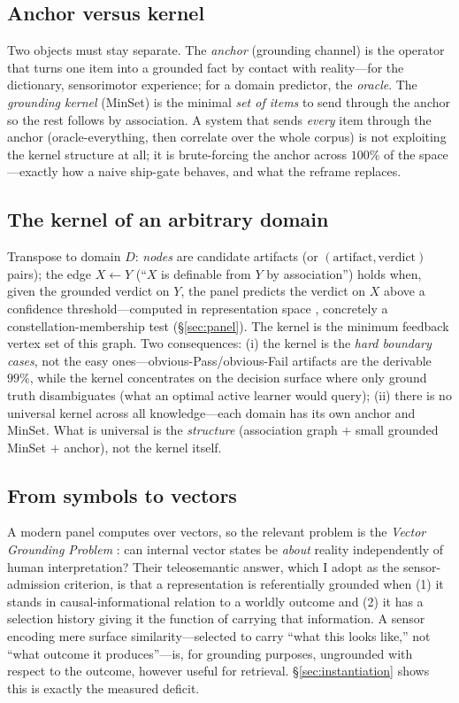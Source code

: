 \documentclass[10pt,twocolumn]{article}
\begin{document}
\subsection{Anchor versus kernel}
Two objects must stay separate. The \emph{anchor} (grounding channel) is the
operator that turns one item into a grounded fact by contact with reality---for
the dictionary, sensorimotor experience; for a domain predictor, the
\emph{oracle}. The \emph{grounding kernel} (MinSet) is the minimal \emph{set of
items} to send through the anchor so the rest follows by association. A system
that sends \emph{every} item through the anchor (oracle-everything, then correlate
over the whole corpus) is not exploiting the kernel structure at all; it is
brute-forcing the anchor across $100\%$ of the space---exactly how a naive
ship-gate behaves, and what the reframe replaces.

\subsection{The kernel of an arbitrary domain}
Transpose to domain $D$: \emph{nodes} are candidate artifacts (or
$(\text{artifact},\text{verdict})$ pairs); the edge $X\!\leftarrow\!Y$ (``$X$ is
definable from $Y$ by association'') holds when, given the grounded verdict on
$Y$, the panel predicts the verdict on $X$ above a confidence threshold---computed
in representation space \citep{lecun2022path}, concretely a constellation-membership
test (\S\ref{sec:panel}). The kernel is the minimum feedback vertex set of this
graph. Two consequences: (i) the kernel is the \emph{hard boundary cases}, not the
easy ones---obvious-\textsf{Pass}/obvious-\textsf{Fail} artifacts are the derivable
$99\%$, while the kernel concentrates on the decision surface where only ground
truth disambiguates (what an optimal active learner would query); (ii) there is no
universal kernel across all knowledge---each domain has its own anchor and MinSet.
What is universal is the \emph{structure} (association graph $+$ small grounded
MinSet $+$ anchor), not the kernel itself.

\subsection{From symbols to vectors}
A modern panel computes over vectors, so the relevant problem is the
\emph{Vector Grounding Problem} \citep{mollo2023vector}: can internal vector states
be \emph{about} reality independently of human interpretation? Their teleosemantic
answer, which I adopt as the sensor-admission criterion, is that a representation
is referentially grounded when (1) it stands in causal-informational relation to a
worldly outcome and (2) it has a selection history giving it the function of
carrying that information. A sensor encoding mere surface similarity---selected to
carry ``what this looks like,'' not ``what outcome it produces''---is, for
grounding purposes, ungrounded with respect to the outcome, however useful for
retrieval. \S\ref{sec:instantiation} shows this is exactly the measured deficit.
\end{document}
